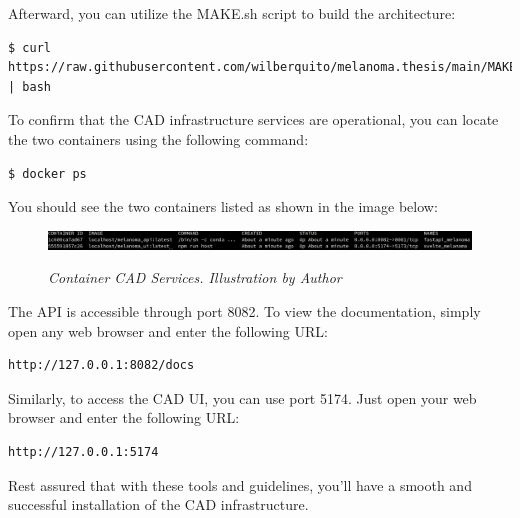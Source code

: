 Afterward, you can utilize the MAKE.sh script to build the architecture:

\begin{Verbatim}[fontsize=\scriptsize]
$ curl https://raw.githubusercontent.com/wilberquito/melanoma.thesis/main/MAKE.sh | bash
\end{Verbatim}

To confirm that the CAD infrastructure services are operational,
you can locate the two containers using the following command:

\begin{Verbatim}[fontsize=\scriptsize]
$ docker ps
\end{Verbatim}

You should see the two containers listed as shown in the image below:

\begin{figure}[H]
\centering
\includegraphics[width=\textwidth]{imatges/appendices/services.png}
\caption[Container CAD Services]{\textit{Container CAD Services. Illustration by Author}}
{\label{fig:polling-layer}}
\end{figure}

The API is accessible through port 8082. To view the documentation, simply open any web browser and enter the following URL:

\begin{Verbatim}[fontsize=\scriptsize]
http://127.0.0.1:8082/docs
\end{Verbatim}

Similarly, to access the CAD UI, you can use port 5174. Just open your web browser and enter the following URL:

\begin{Verbatim}[fontsize=\scriptsize]
http://127.0.0.1:5174
\end{Verbatim}

Rest assured that with these tools and guidelines,
you'll have a smooth and successful installation of the CAD infrastructure.
